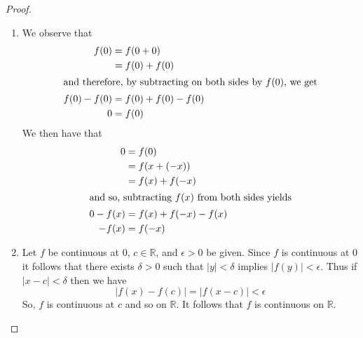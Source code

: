 \begin{enumerate}
        \begin{proof}
        \begin{enumerate}
            \item We observe that
            \begin{align*}
                f(0) &= f(0+0) \\
                &= f(0) + f(0) \\
                \intertext{and therefore, by subtracting on both sides by \( f(0) \), we get}
                f(0)-f(0) &= f(0) + f(0) - f(0) \\
                0 &= f(0)
            \end{align*}
            We then have that
            \begin{align*}
                0 &= f(0) \\
                &= f(x+(-x)) \\
                &= f(x) + f(-x) \\
                \intertext{and so, subtracting \( f(x) \) from both sides yields}
                0 -f(x) &= f(x) + f(-x) - f(x) \\
                -f(x) &= f(-x)
            \end{align*}
            
            \item Let \( f \) be continuous at \( 0 \), \(c \in \mathbb{R} \), and \( \epsilon > 0 \) be given. Since \( f \) is continuous at \( 0 \) it follows that there exists \( \delta > 0 \) such that \( \vert y \vert < \delta \) implies \( \vert f(y) \vert < \epsilon \). Thus if \( \vert x-c \vert < \delta \) then we have
            \[
            \vert f(x) - f(c) \vert = \vert f(x-c) \vert < \epsilon
            \]
            So, \( f \) is continuous at \( c \) and so on \( \mathbb{R} \). It follows that \( f \) is continuous on \( \mathbb{R} \). 
            

\end{enumerate}
\end{proof}
\end{enumerate}

